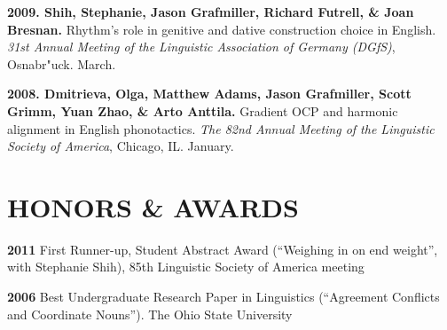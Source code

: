 \documentclass[11pt,]{article}
\begin{document}
\textbf{2009. Shih, Stephanie, Jason Grafmiller, Richard Futrell, \&
Joan Bresnan.} Rhythm's role in genitive and dative construction choice
in English. \emph{31st Annual Meeting of the Linguistic Association of
Germany (DGfS)}, Osnabr"uck. March.

\textbf{2008. Dmitrieva, Olga, Matthew Adams, Jason Grafmiller, Scott
Grimm, Yuan Zhao, \& Arto Anttila.} Gradient OCP and harmonic alignment
in English phonotactics. \emph{The 82nd Annual Meeting of the Linguistic
Society of America}, Chicago, IL. January.

\section{HONORS \& AWARDS}\label{honors-awards}

\textbf{2011} First Runner-up, Student Abstract Award (``Weighing in on
end weight'', with Stephanie Shih), 85th Linguistic Society of America
meeting

\textbf{2006} Best Undergraduate Research Paper in Linguistics
(``Agreement Conflicts and Coordinate Nouns''). The Ohio State
University
\end{document}
